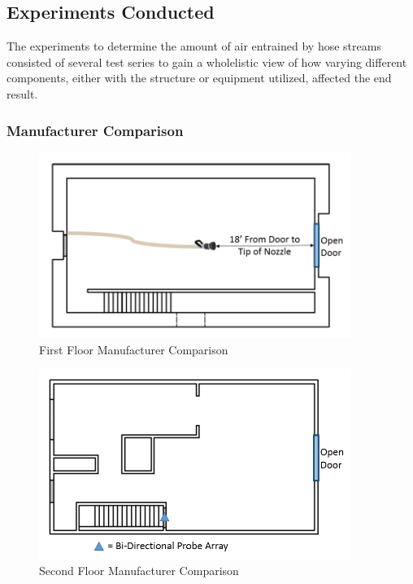 \documentclass{article}
\begin{document}
\clearpage

\subsection{Experiments Conducted}

The experiments to determine the amount of air entrained by hose streams consisted of several test series to gain a wholelistic view of how varying different components, either with the structure or equipment utilized, affected the end result.


\subsubsection{Manufacturer Comparison}

\begin{figure}[!ht]
	\centering
	\includegraphics[width=4in]{Figures/Air_Entrainment/Measurement_Locations_Firstfloor.png}
	\caption{First Floor Manufacturer Comparison}
	\label{fig:First_Floor_Manufacturer_Comparison}
\end{figure}

\begin{figure}[!ht]
	\centering
	\includegraphics[width=4in]{Figures/Air_Entrainment/Measurement_Locations_Secondfloor.png}
	\caption{Second Floor Manufacturer Comparison}
	\label{fig:Second_Floor_Manufacturer_Comparison}
\end{figure}
\end{document}
